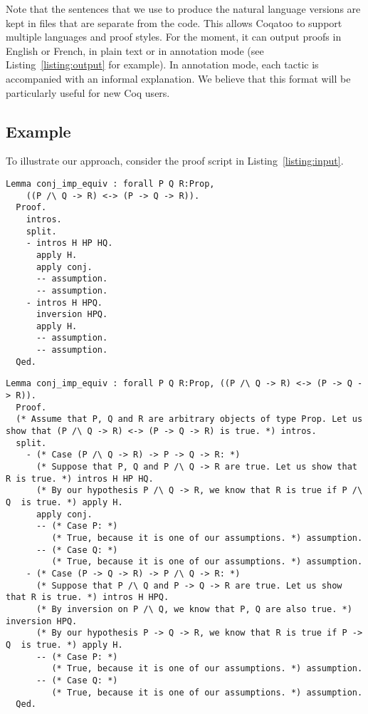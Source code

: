 \documentclass[sigplan,9pt]{acmart}\settopmatter{printfolios=true,printccs=false,printacmref=false}
\begin{document}
Note that the sentences that we use to produce the natural language versions are kept in files that are separate from the code. This allows Coqatoo to support multiple languages and proof styles. For the moment, it can output proofs in English or French, in plain text or in annotation mode (see Listing~\ref{listing:output} for example). In annotation mode, each tactic is accompanied with an informal explanation. We believe that this format will be particularly useful for new Coq users.

\subsection{Example}
To illustrate our approach, consider the proof script in Listing~\ref{listing:input}.
\begin{lstlisting}[label=listing:input,captionpos=b,caption=Proof script given as input]
  Lemma conj_imp_equiv : forall P Q R:Prop, 
    ((P /\ Q -> R) <-> (P -> Q -> R)).
  Proof.
    intros.
    split.
    - intros H HP HQ.
      apply H.
      apply conj.
      -- assumption.
      -- assumption.
    - intros H HPQ.
      inversion HPQ.
      apply H.
      -- assumption.
      -- assumption.
  Qed.
\end{lstlisting}

\begin{figure*}
\begin{lstlisting}[label=listing:output, captionpos=b, caption={Output in annotation mode}]
  Lemma conj_imp_equiv : forall P Q R:Prop, ((P /\ Q -> R) <-> (P -> Q -> R)).
  Proof.
  (* Assume that P, Q and R are arbitrary objects of type Prop. Let us show that (P /\ Q -> R) <-> (P -> Q -> R) is true. *) intros.
  split.
    - (* Case (P /\ Q -> R) -> P -> Q -> R: *) 
      (* Suppose that P, Q and P /\ Q -> R are true. Let us show that R is true. *) intros H HP HQ.
      (* By our hypothesis P /\ Q -> R, we know that R is true if P /\ Q  is true. *) apply H.
      apply conj.
      -- (* Case P: *)
         (* True, because it is one of our assumptions. *) assumption.
      -- (* Case Q: *)
         (* True, because it is one of our assumptions. *) assumption.
    - (* Case (P -> Q -> R) -> P /\ Q -> R: *)
      (* Suppose that P /\ Q and P -> Q -> R are true. Let us show that R is true. *) intros H HPQ.
      (* By inversion on P /\ Q, we know that P, Q are also true. *) inversion HPQ.
      (* By our hypothesis P -> Q -> R, we know that R is true if P -> Q  is true. *) apply H.
      -- (* Case P: *)
         (* True, because it is one of our assumptions. *) assumption.
      -- (* Case Q: *)
         (* True, because it is one of our assumptions. *) assumption.
  Qed.
\end{lstlisting}
\end{figure*}
\end{document}
